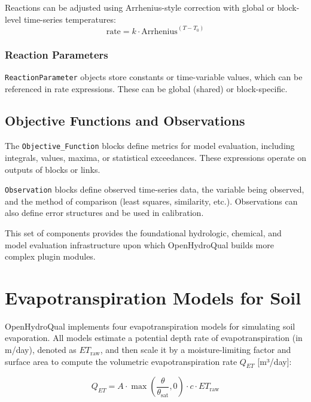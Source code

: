 \documentclass[12pt]{report}
\begin{document}
Reactions can be adjusted using Arrhenius-style correction with global or block-level time-series temperatures:
\begin{equation}
\text{rate} = k \cdot \text{Arrhenius}^{(T - T_0)}
\end{equation}

\subsection{Reaction Parameters}

\texttt{ReactionParameter} objects store constants or time-variable values, which can be referenced in rate expressions. These can be global (shared) or block-specific.

\section{Objective Functions and Observations}

The \texttt{Objective\_Function} blocks define metrics for model evaluation, including integrals, values, maxima, or statistical exceedances. These expressions operate on outputs of blocks or links.

\texttt{Observation} blocks define observed time-series data, the variable being observed, and the method of comparison (least squares, similarity, etc.). Observations can also define error structures and be used in calibration.

This set of components provides the foundational hydrologic, chemical, and model evaluation infrastructure upon which OpenHydroQual builds more complex plugin modules.


\chapter{Evapotranspiration Models for Soil}

OpenHydroQual implements four evapotranspiration models for simulating soil evaporation. All models estimate a potential depth rate of evapotranspiration (in m/day), denoted as \( ET_{\text{raw}} \), and then scale it by a moisture-limiting factor and surface area to compute the volumetric evapotranspiration rate \( Q_{ET} \) [m³/day]:

\begin{equation}
Q_{ET} = A \cdot \max\left(\frac{\theta}{\theta_{\text{sat}}}, 0\right) \cdot c \cdot ET_{\text{raw}}
\end{equation}
\end{document}
